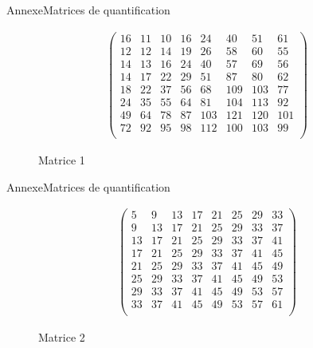 \begin{frame}{Annexe}{Matrices de quantification}
    \begin{figure}
        \begin{align*}
            \begin{pmatrix}
                16 & 11 & 10 & 16 & 24  & 40 & 51 & 61 \\
                12 & 12 & 14 & 19 & 26  & 58 & 60 & 55 \\
                14 & 13 & 16 & 24 & 40  & 57 & 69 & 56 \\
                14 & 17 & 22 & 29 & 51  & 87 & 80 & 62 \\
                18 & 22 & 37 & 56 & 68  & 109 & 103 & 77 \\
                24 & 35 & 55 & 64 & 81  & 104 & 113 & 92 \\
                49 & 64 & 78 & 87 & 103 & 121 & 120 & 101 \\
                72 & 92 & 95 & 98 & 112 & 100 & 103 & 99 \\
            \end{pmatrix}
        \end{align*}
        \caption{Matrice 1}    
    \end{figure}
\end{frame}

\begin{frame}{Annexe}{Matrices de quantification}
    \begin{figure}
        \begin{align*}
            \begin{pmatrix}
                5 & 9 & 13 & 17 & 21 & 25 & 29 & 33 \\
                9 & 13 & 17 & 21 & 25 & 29 & 33 &37 \\
                13 & 17 & 21 & 25 & 29 & 33 & 37 &41 \\
                17 & 21 & 25 & 29 & 33 & 37 & 41 &45 \\
                21 & 25 & 29 & 33 & 37 & 41 & 45 &49 \\
                25 & 29 & 33 & 37 & 41 & 45 & 49 &53 \\
                29 & 33 & 37 & 41 & 45 & 49 & 53 &57 \\
                33 & 37 & 41 & 45 & 49 & 53 & 57 &61 \\
            \end{pmatrix}
        \end{align*}
        \caption{Matrice 2}
    \end{figure}
\end{frame}

